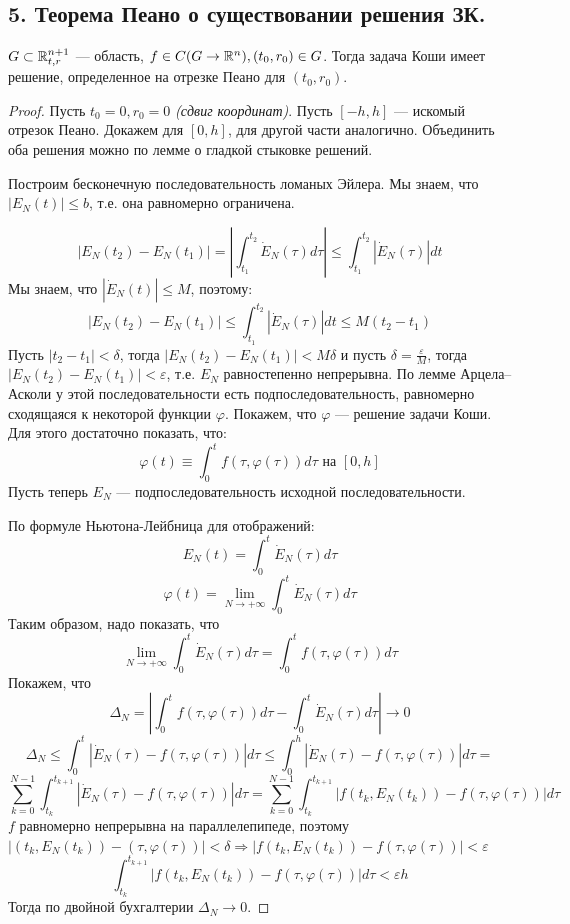 \subsection*{5. Теорема Пеано о существовании решения ЗК.}

\begin{theorem}
    \(G\subset \mathbb{R}^{n + 1}_{t, r}\) --- область, \(f\in C(G\to\mathbb{R}^n), (t_0, r_0)\in G\). Тогда задача Коши имеет решение, определенное на отрезке Пеано для \((t_0, r_0)\).
\end{theorem}
\begin{proof}
    Пусть \(t_0 = 0, r_0 = 0\) \textit{(сдвиг координат)}. Пусть \([ - h, h]\) --- искомый отрезок Пеано. Докажем для \([0, h]\), для другой части аналогично. Объединить оба решения можно по лемме о гладкой стыковке решений.

    Построим бесконечную последовательность ломаных Эйлера. Мы знаем, что \(|E_N(t)| \leq b\), т.е. она равномерно ограничена.

    \[|E_N(t_2) - E_N(t_1)| = \left|\int_{t_1}^{t_2} \dot E_N(\tau)d\tau\right| \leq \int_{t_1}^{t_2} |\dot{E}_N(\tau)|dt\]
    Мы знаем, что \(|\dot{E}_N(t)| \leq M\), поэтому:
    \[|E_N(t_2) - E_N(t_1)| \leq \int_{t_1}^{t_2} |\dot{E}_N(\tau)|dt \leq M(t_2 - t_1)\]
    Пусть \(|t_2 - t_1|< \delta\), тогда \(|E_N(t_2) - E_N(t_1)| < M\delta\) и пусть \(\delta = \frac{\varepsilon}{M}\), тогда \(|E_N(t_2) - E_N(t_1)| < \varepsilon\), т.е. \(E_N\) равностепенно непрерывна. По лемме Арцела–Асколи у этой последовательности есть подпоследовательность, равномерно сходящаяся к некоторой функции \(\varphi\). Покажем, что \(\varphi\) --- решение задачи Коши. Для этого достаточно показать, что:
    \[\varphi(t) \equiv \int_0^{t} f(\tau, \varphi(\tau))d\tau \text{ на } [0, h]\]
    Пусть теперь \(E_N\) --- подпоследовательность исходной последовательности.

    По формуле Ньютона-Лейбница для отображений:
    \[E_N(t) = \int_0^t \dot{E}_N(\tau)d\tau\]
    \[\varphi(t) = \lim_{N \to +\infty}\int_0^t \dot{E}_N(\tau)d\tau\]
    Таким образом, надо показать, что
    \[\lim_{N \to +\infty}\int_0^t \dot{E}_N(\tau)d\tau = \int_0^{t} f(\tau, \varphi(\tau))d\tau\]
    Покажем, что
    \[\Delta_N = \left|\int_0^{t} f(\tau, \varphi(\tau))d\tau - \int_0^t \dot{E}_N(\tau)d\tau\right| \to 0\]
    \[\Delta_N \leq \int_0^t |\dot{E}_N(\tau) - f(\tau, \varphi(\tau))|d\tau \leq \int_0^h |\dot{E}_N(\tau) - f(\tau, \varphi(\tau))|d\tau =\]
    \[\sum_{k = 0}^{N - 1} \int_{t_k}^{t_{k+1}} |\dot{E}_N(\tau) - f(\tau, \varphi(\tau))|d\tau = \sum_{k = 0}^{N - 1} \int_{t_k}^{t_{k+1}} |f(t_k, E_N(t_k)) - f(\tau, \varphi(\tau))|d\tau\]
    \(f\) равномерно непрерывна на параллелепипеде, поэтому \(|(t_k, E_N(t_k)) - (\tau, \varphi(\tau))| < \delta \Rightarrow |f(t_k, E_N(t_k)) - f(\tau, \varphi(\tau))| < \varepsilon\)
    \[\int_{t_k}^{t_{k+1}} |f(t_k, E_N(t_k)) - f(\tau, \varphi(\tau))|d\tau < \varepsilon h\]
    Тогда по двойной бухгалтерии \(\Delta_N \to 0\).


\end{proof}
